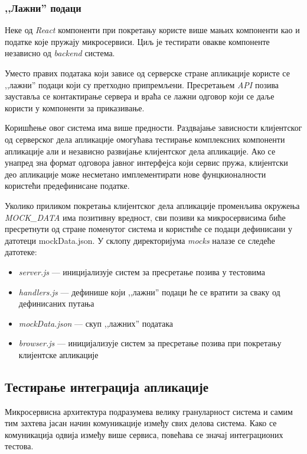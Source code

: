 \documentclass[12pt,oneside]{memoir}
\begin{document}
\subsubsection{,,Лажни” подаци}

Неке од \textit{React} компоненти при покретању користе више мањих компоненти као и податке које пружају микросервиси. Циљ је тестирати овакве компоненте независно од \textit{backend} система.

Уместо правих података који зависе од серверске стране апликације користе се ,,лажни” подаци који су претходно припремљени. Пресретањем \textit{API}  позива зауставља се контактирање сервера и враћа се лажни одговор који се даље користи у компоненти за приказивање.

Коришћење овог система има више предности. Раздвајање зависности клијентског од серверског дела апликације омогућава тестирање комплексних компоненти апликације али и независно развијање клијентског дела апликације. Ако се унапред зна формат одговора јавног интерфејса који сервис пружа, клијентски део апликације може несметано имплементирати нове фунцкионалности користећи предефинисане податке. 

Уколико приликом покретања клијентског дела апликације променљива окружења \textit{MOCK\_DATA} има позитивну вредност, сви позиви ка микросервисима биће пресретнути од стране поменутог система и користиће се подаци дефинисани у датотеци {mockData.json}. У склопу директоријума \textit{mocks} налазе се следеће датотеке:

\begin{itemize}
\item \textit{server.js} --- иницијализује систем за пресретање позива у тестовима
\item \textit{handlers.js} --- дефинише који ,,лажни” подаци ће се вратити за сваку од дефинисаних путања
\item \textit{mockData.json} --- скуп ,,лажних” података
\item \textit{browser.js} --- иницијализује систем за пресретање позива при покретању клијентске апликације
\end{itemize}


\subsection{Тестирање интеграција апликације}

Микросервисна архитектура подразумева велику грануларност система и самим тим захтева јасан начин комуникације између свих делова система. Како се комуникација одвија између више сервиса, повећава се значај интеграционих тестова.
\end{document}
